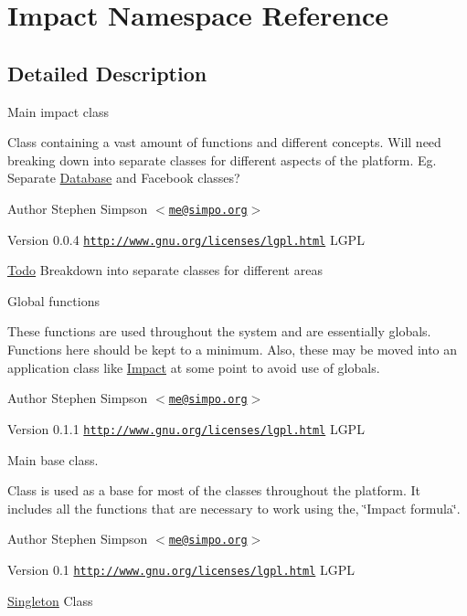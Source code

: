 \hypertarget{namespaceImpact}{
\section{Impact Namespace Reference}
\label{namespaceImpact}
}


\subsection{Detailed Description}
Main impact class

Class containing a vast amount of functions and different concepts. Will need breaking down into separate classes for different aspects of the platform. Eg. Separate \hyperlink{classDatabase}{Database} and Facebook classes?

\begin{DoxyAuthor}{Author}
Stephen Simpson $<$\href{mailto:me@simpo.org}{\tt me@simpo.org}$>$ 
\end{DoxyAuthor}
\begin{DoxyVersion}{Version}
0.0.4  \href{http://www.gnu.org/licenses/lgpl.html}{\tt http://www.gnu.org/licenses/lgpl.html} LGPL
\end{DoxyVersion}
\begin{Desc}
\item[\hyperlink{todo__todo000001}{Todo}]Breakdown into separate classes for different areas\end{Desc}


Global functions

These functions are used throughout the system and are essentially globals. Functions here should be kept to a minimum. Also, these may be moved into an application class like \hyperlink{namespaceImpact}{Impact} at some point to avoid use of globals.

\begin{DoxyAuthor}{Author}
Stephen Simpson $<$\href{mailto:me@simpo.org}{\tt me@simpo.org}$>$ 
\end{DoxyAuthor}
\begin{DoxyVersion}{Version}
0.1.1  \href{http://www.gnu.org/licenses/lgpl.html}{\tt http://www.gnu.org/licenses/lgpl.html} LGPL
\end{DoxyVersion}
Main base class.

Class is used as a base for most of the classes throughout the platform. It includes all the functions that are necessary to work using the, \char`\"{}Impact formula\char`\"{}.

\begin{DoxyAuthor}{Author}
Stephen Simpson $<$\href{mailto:me@simpo.org}{\tt me@simpo.org}$>$ 
\end{DoxyAuthor}
\begin{DoxyVersion}{Version}
0.1  \href{http://www.gnu.org/licenses/lgpl.html}{\tt http://www.gnu.org/licenses/lgpl.html} LGPL
\end{DoxyVersion}
\hyperlink{classSingleton}{Singleton} Class

